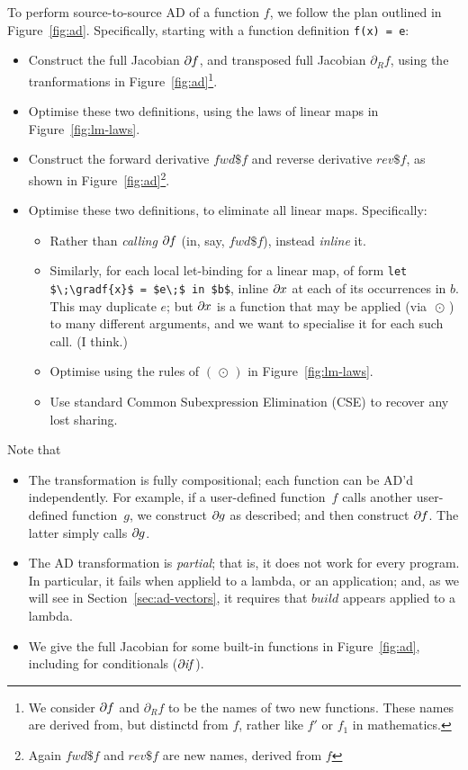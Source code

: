 \documentclass[sigplan,review]{acmart}
\newcommand{\deriv}{\partial}  %
\newcommand{\gradf}[1]{\deriv\hspace{-0.15mm} #1}  %
\newcommand{\gradft}[1]{\deriv_R#1}  %
\newcommand{\fwdDf}[1]{\mathit{fwd\$}#1}  %
\newcommand{\revDf}[1]{\mathit{rev\$}#1}  %
\newcommand{\iffun}{\mathit{if}}
\newcommand{\buildfun}{\mathit{build}}
\newcommand{\lmcomp}{\,\circ\,}   %
\newcommand{\lmapply}{\,\odot\,}      %
\begin{document}
To perform source-to-source AD of a function $f$, we follow the plan
outlined in Figure~\ref{fig:ad}.  Specifically, starting with a
function definition \lstinline|f(x) = e|:

\begin{itemize}
\item Construct the full Jacobian $\gradf{f}$, and transposed full Jacobian $\gradft{f}$,
  using the tranformations in Figure~\ref{fig:ad}\footnote{
    We consider $\gradf{f}$ and $\gradft{f}$ to be the names of two new functions.
    These names are derived from, but distinctd from $f$, rather like $f'$ or $f_1$ in mathematics.
}.
\item Optimise these two definitions, using the laws of linear maps
  in Figure~\ref{fig:lm-laws}.
\item Construct the forward derivative $\fwdDf{f}$ and reverse derivative $\revDf{f}$,
  as shown in Figure~\ref{fig:ad}\footnote{Again $\fwdDf{f}$ and $\revDf{f}$ are new names, derived from $f$}.
\item Optimise these two definitions, to eliminate all linear maps. Specifically:
  \begin{itemize}
    \item Rather than \emph{calling} $\gradf{f}$ (in, say, $\fwdDf{f}$), instead \emph{inline} it.
    \item Similarly, for each local let-binding for a linear map, of form \lstinline|let $\;\gradf{x}$ = $e\;$ in $b$|,
      inline $\gradf{x}$ at each of its occurrences in $b$. This may duplicate $e$; but $\gradf{x}$ is a function
      that may be applied (via $\lmapply$) to many different arguments, and we want to specialise it for each
      such call.  (I think.)
    \item Optimise using the rules of $(\lmapply)$ in Figure~\ref{fig:lm-laws}.
    \item Use standard Common Subexpression Elimination (CSE) to recover any lost sharing.
  \end{itemize}
\end{itemize}

Note that
\begin{itemize}
\item The transformation is fully compositional; each function can be AD'd independently.
  For example, if a user-defined
  function~$f$ calls another user-defined function~$g$, we construct $\gradf{g}$ as
  described; and then construct $\gradf{f}$. The latter simply calls $\gradf{g}$.

\item The AD transformation is \emph{partial}; that is, it does not work for every
  program. In particular, it fails when applield to a lambda, or an application; and,
  as we will see in Section~\ref{sec:ad-vectors}, it requires that $\buildfun$ appears
  applied to a lambda.

\item We give the full Jacobian for some built-in functions in Figure~\ref{fig:ad}, including
  for conditionals ($\gradf{\iffun}$).
\end{itemize}
\end{document}
